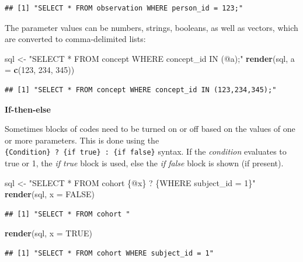 \documentclass[11pt]{book}
\newenvironment{Shaded}{\begin{snugshade}}{\end{snugshade}}
\newcommand{\KeywordTok}[1]{\textcolor[rgb]{0.13,0.29,0.53}{\textbf{#1}}}
\newcommand{\DataTypeTok}[1]{\textcolor[rgb]{0.13,0.29,0.53}{#1}}
\newcommand{\DecValTok}[1]{\textcolor[rgb]{0.00,0.00,0.81}{#1}}
\newcommand{\StringTok}[1]{\textcolor[rgb]{0.31,0.60,0.02}{#1}}
\newcommand{\OtherTok}[1]{\textcolor[rgb]{0.56,0.35,0.01}{#1}}
\newcommand{\NormalTok}[1]{#1}
\begin{document}
\begin{verbatim}
## [1] "SELECT * FROM observation WHERE person_id = 123;"
\end{verbatim}

The parameter values can be numbers, strings, booleans, as well as
vectors, which are converted to comma-delimited lists:

\begin{Shaded}
\begin{Highlighting}[]
\NormalTok{sql <-}\StringTok{ "SELECT * FROM concept WHERE concept_id IN (@a);"}
\KeywordTok{render}\NormalTok{(sql, }\DataTypeTok{a =} \KeywordTok{c}\NormalTok{(}\DecValTok{123}\NormalTok{, }\DecValTok{234}\NormalTok{, }\DecValTok{345}\NormalTok{))}
\end{Highlighting}
\end{Shaded}

\begin{verbatim}
## [1] "SELECT * FROM concept WHERE concept_id IN (123,234,345);"
\end{verbatim}

\textbf{If-then-else}

Sometimes blocks of codes need to be turned on or off based on the
values of one or more parameters. This is done using the
\texttt{\{Condition\}\ ?\ \{if\ true\}\ :\ \{if\ false\}} syntax. If the
\emph{condition} evaluates to true or 1, the \emph{if true} block is
used, else the \emph{if false} block is shown (if present).

\begin{Shaded}
\begin{Highlighting}[]
\NormalTok{sql <-}\StringTok{ "SELECT * FROM cohort \{@x\} ? \{WHERE subject_id = 1\}"}
\KeywordTok{render}\NormalTok{(sql, }\DataTypeTok{x =} \OtherTok{FALSE}\NormalTok{)}
\end{Highlighting}
\end{Shaded}

\begin{verbatim}
## [1] "SELECT * FROM cohort "
\end{verbatim}

\begin{Shaded}
\begin{Highlighting}[]
\KeywordTok{render}\NormalTok{(sql, }\DataTypeTok{x =} \OtherTok{TRUE}\NormalTok{)}
\end{Highlighting}
\end{Shaded}

\begin{verbatim}
## [1] "SELECT * FROM cohort WHERE subject_id = 1"
\end{verbatim}
\end{document}
